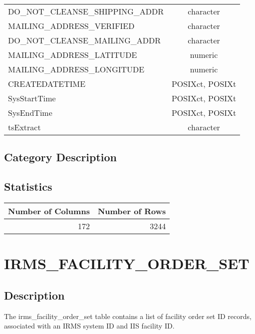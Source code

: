 \documentclass[
  letterpaper,
  DIV=11,
  numbers=noendperiod]{scrreprt}
\begin{document}
\begin{longtable}{lc}
DO\_NOT\_CLEANSE\_SHIPPING\_ADDR & character \\ 
MAILING\_ADDRESS\_VERIFIED & character \\ 
DO\_NOT\_CLEANSE\_MAILING\_ADDR & character \\ 
MAILING\_ADDRESS\_LATITUDE & numeric \\ 
MAILING\_ADDRESS\_LONGITUDE & numeric \\ 
CREATEDATETIME & POSIXct, POSIXt \\ 
SysStartTime & POSIXct, POSIXt \\ 
SysEndTime & POSIXct, POSIXt \\ 
tsExtract & character \\ 
\bottomrule
\end{longtable}

\hypertarget{category-description-15}{%
\section*{Category Description}\label{category-description-15}}

\hypertarget{statistics-15}{%
\section*{Statistics}\label{statistics-15}}

\begin{longtable}{rr}
\toprule
Number of Columns & Number of Rows \\ 
\midrule
172 & 3244 \\ 
\bottomrule
\end{longtable}

\hypertarget{irms_facility_order_set}{%
\chapter*{IRMS\_FACILITY\_ORDER\_SET}\label{irms_facility_order_set}}

\hypertarget{description-16}{%
\section*{Description}\label{description-16}}

The irms\_facility\_order\_set table contains a list of facility order
set ID records, associated with an IRMS system ID and IIS facility ID.
\end{document}
